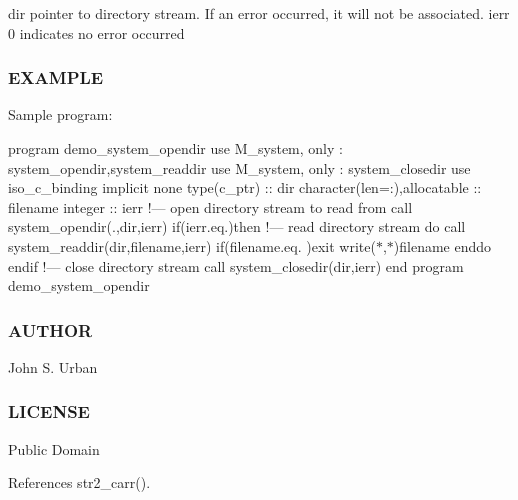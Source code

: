 dir pointer to directory stream. If an error occurred, it will not be associated. ierr 0 indicates no error occurred \subsubsection*{E\+X\+A\+M\+P\+LE}

Sample program\+:

program demo\+\_\+system\+\_\+opendir use M\+\_\+system, only \+: system\+\_\+opendir,system\+\_\+readdir use M\+\_\+system, only \+: system\+\_\+closedir use iso\+\_\+c\+\_\+binding implicit none type(c\+\_\+ptr) \+:\+: dir character(len=\+:),allocatable \+:\+: filename integer \+:\+: ierr !--- open directory stream to read from call system\+\_\+opendir(\textquotesingle{}.\textquotesingle{},dir,ierr) if(ierr.\+eq.)then !--- read directory stream do call system\+\_\+readdir(dir,filename,ierr) if(filename.\+eq.\textquotesingle{} \textquotesingle{})exit write($\ast$,$\ast$)filename enddo endif !--- close directory stream call system\+\_\+closedir(dir,ierr) end program demo\+\_\+system\+\_\+opendir \subsubsection*{A\+U\+T\+H\+OR}

John S. Urban \subsubsection*{L\+I\+C\+E\+N\+SE}

Public Domain 

References str2\+\_\+carr().

